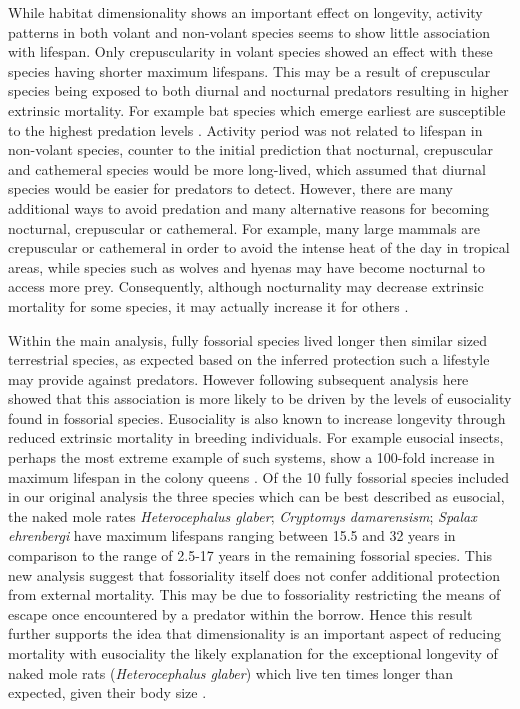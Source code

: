 While habitat dimensionality shows an important effect on longevity, activity patterns in both volant and non-volant species seems to show little association with lifespan. Only crepuscularity in volant species showed an effect with these species having shorter maximum lifespans. This may be a result of crepuscular species being exposed to both diurnal and nocturnal predators resulting in higher extrinsic mortality. For example bat species which emerge earliest are susceptible to the highest predation levels \citep{jones1994foraging}. Activity period was not related to lifespan in non-volant species, counter to the initial prediction that nocturnal, crepuscular and cathemeral species would be more long-lived, which assumed that diurnal species would be easier for predators to detect. However, there are many additional ways to avoid predation and many alternative reasons for becoming nocturnal, crepuscular or cathemeral. For example, many large mammals are crepuscular or cathemeral in order to avoid the intense heat of the day in tropical areas, while species such as wolves and hyenas may have become nocturnal to access more prey. Consequently, although nocturnality may decrease extrinsic mortality for some species, it may actually increase it for others \citep{prugh2014does}.


Within the main analysis, fully fossorial species lived longer then similar sized terrestrial species, as expected based on the inferred protection such a lifestyle may provide against predators. However following \cite{williams2015ecology} subsequent analysis here showed that this association is more likely to be driven by the levels of eusociality found in fossorial species. Eusociality is also known to increase longevity through reduced extrinsic mortality in breeding individuals. For example eusocial insects, perhaps the most extreme example of such systems, show a 100-fold increase in maximum lifespan in the colony queens \citep{keller1997extraordinary}. Of the 10 fully fossorial species included in our original analysis the three species which can be best described as eusocial, the naked mole rates \textit{Heterocephalus glaber}; \textit{Cryptomys damarensism}; \textit{Spalax ehrenbergi} have maximum lifespans ranging between 15.5 and 32 years in comparison to the range of 2.5-17 years in the remaining fossorial species. This new analysis suggest that fossoriality itself does not confer additional protection from external mortality. This may be due to fossoriality restricting the means of escape once encountered by a predator within the borrow. Hence this result further supports the idea that dimensionality is an important aspect of reducing mortality with eusociality the likely explanation for the exceptional longevity of naked mole rats (\textit{Heterocephalus glaber}) which live ten times longer than expected, given their body size \citep{buffenstein2002naked}.


